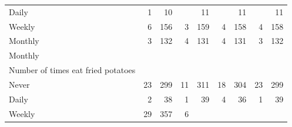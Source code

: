 \documentclass{article}
\begin{document}
\begin{table}[!h]
{\begin{tabular}{lllllllll}
			\multicolumn{1}{l}{\hspace{5em}Daily} &
			\multicolumn{1}{|r}{1} &
			\multicolumn{1}{r}{10} &
			\multicolumn{1}{r}{} &
			\multicolumn{1}{r}{11} &
			\multicolumn{1}{r}{} &
			\multicolumn{1}{r}{11} &
			\multicolumn{1}{r}{} &
			\multicolumn{1}{r}{11} \\
			\multicolumn{1}{l}{\hspace{5em}Weekly} &
			\multicolumn{1}{|r}{6} &
			\multicolumn{1}{r}{156} &
			\multicolumn{1}{r}{3} &
			\multicolumn{1}{r}{159} &
			\multicolumn{1}{r}{4} &
			\multicolumn{1}{r}{158} &
			\multicolumn{1}{r}{4} &
			\multicolumn{1}{r}{158} \\
			\multicolumn{1}{l}{\hspace{5em}Monthly} &
			\multicolumn{1}{|r}{3} &
			\multicolumn{1}{r}{132} &
			\multicolumn{1}{r}{4} &
			\multicolumn{1}{r}{131} &
			\multicolumn{1}{r}{4} &
			\multicolumn{1}{r}{131} &
			\multicolumn{1}{r}{3} &
			\multicolumn{1}{r}{132} \\
			\multicolumn{1}{l}{\hspace{3em}Monthly} &
			\multicolumn{1}{|r}{} &
			\multicolumn{1}{r}{} &
			\multicolumn{1}{r}{} &
			\multicolumn{1}{r}{} &
			\multicolumn{1}{r}{} &
			\multicolumn{1}{r}{} &
			\multicolumn{1}{r}{} &
			\multicolumn{1}{r}{} \\
			\multicolumn{1}{l}{\hspace{4em}Number of times eat fried potatoes} &
			\multicolumn{1}{|r}{} &
			\multicolumn{1}{r}{} &
			\multicolumn{1}{r}{} &
			\multicolumn{1}{r}{} &
			\multicolumn{1}{r}{} &
			\multicolumn{1}{r}{} &
			\multicolumn{1}{r}{} &
			\multicolumn{1}{r}{} \\
			\multicolumn{1}{l}{\hspace{5em}Never} &
			\multicolumn{1}{|r}{23} &
			\multicolumn{1}{r}{299} &
			\multicolumn{1}{r}{11} &
			\multicolumn{1}{r}{311} &
			\multicolumn{1}{r}{18} &
			\multicolumn{1}{r}{304} &
			\multicolumn{1}{r}{23} &
			\multicolumn{1}{r}{299} \\
			\multicolumn{1}{l}{\hspace{5em}Daily} &
			\multicolumn{1}{|r}{2} &
			\multicolumn{1}{r}{38} &
			\multicolumn{1}{r}{1} &
			\multicolumn{1}{r}{39} &
			\multicolumn{1}{r}{4} &
			\multicolumn{1}{r}{36} &
			\multicolumn{1}{r}{1} &
			\multicolumn{1}{r}{39} \\
			\multicolumn{1}{l}{\hspace{5em}Weekly} &
			\multicolumn{1}{|r}{29} &
			\multicolumn{1}{r}{357} &
			\multicolumn{1}{r}{6} &

\end{tabular}}
\end{table}
\end{document}
